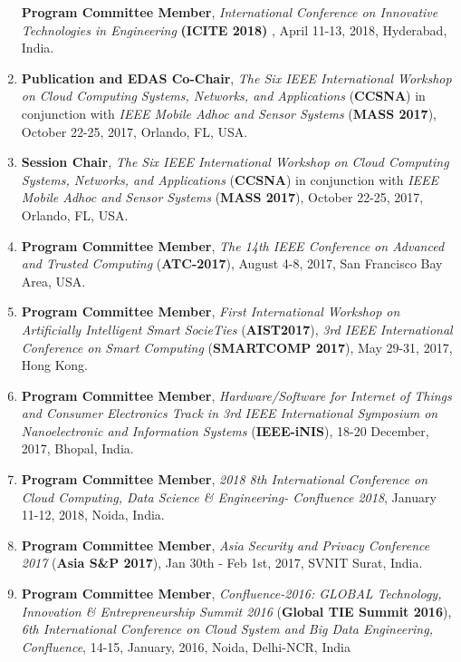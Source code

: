 \begin{enumerate}
\textbf{Program Committee Member}, \textit{International Conference on Innovative Technologies in Engineering} \textbf{(ICITE 2018) }, April 11-13, 2018, Hyderabad, India.

\item
\textbf{Publication and EDAS Co-Chair}, \textit{The Six IEEE International Workshop on Cloud Computing Systems, Networks, and Applications }(\textbf{CCSNA}) in conjunction with \textit{IEEE Mobile Adhoc and Sensor Systems} (\textbf{MASS 2017}), October 22-25, 2017, Orlando, FL, USA. %

\item
\textbf{Session Chair}, \textit{The Six IEEE International Workshop on Cloud Computing Systems, Networks, and Applications }(\textbf{CCSNA}) in conjunction with \textit{IEEE Mobile Adhoc and Sensor Systems} (\textbf{MASS 2017}), October 22-25, 2017, Orlando, FL, USA.%

\item
\textbf{Program Committee Member}, \textit{The 14th IEEE Conference on Advanced and Trusted Computing} (\textbf{ATC-2017}), August 4-8, 2017, San Francisco Bay Area, USA. %

\item
\textbf{Program Committee Member}, \textit{First International Workshop on Artificially Intelligent Smart SocieTies} (\textbf{AIST2017}), \textit{3rd IEEE International Conference on Smart Computing} (\textbf{SMARTCOMP 2017}), May 29-31, 2017, Hong Kong.

\item
\textbf{Program Committee Member},\textit{ Hardware/Software for Internet of Things and Consumer Electronics Track in 3rd IEEE International Symposium on Nanoelectronic and Information Systems} (\textbf{IEEE-iNIS}), 18-20 December, 2017, Bhopal, India.

\item
\textbf{Program Committee Member}, \textit{2018 8th International Conference on Cloud Computing, Data Science \& Engineering- Confluence 2018}, January 11-12, 2018, Noida, India.

\item
\textbf{Program Committee Member}, \textit{Asia Security and Privacy Conference 2017} (\textbf{Asia S\&P 2017}), Jan 30th - Feb 1st, 2017, SVNIT Surat, India.

\item
\textbf{Program Committee Member},  \textit{Confluence-2016: GLOBAL Technology, Innovation \& Entrepreneurship Summit 2016 }(\textbf{Global TIE Summit 2016}),\textit{ 6th International Conference on Cloud System and Big Data Engineering, Confluence}, 14-15, January, 2016, Noida, Delhi-NCR, India


\end{enumerate}
